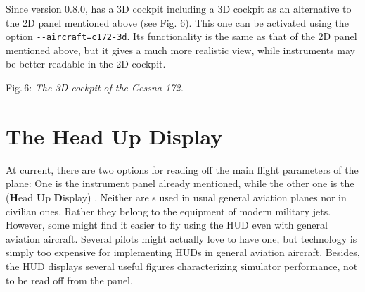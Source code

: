Since version 0.8.0, \FlightGear{} has a 3D cockpit including a 3D cockpit as an alternative to the 2D panel mentioned above (see Fig. 6). This one can be activated using the option \texttt{-$ $-aircraft=c172-3d}. Its functionality is the same as that of the 2D panel mentioned above, but it gives a much more realistic view, while instruments may be better readable in the 2D cockpit.
\medskip

 \centerline{}

\smallskip
 \noindent
Fig.\,6: \textit{The 3D cockpit of the Cessna 172.}
\medskip


\section{The Head Up Display}

At current, there are two options for reading off the main flight parameters of the
plane: One is the instrument panel already mentioned, while the other one is the
 (\textbf{H}ead \textbf{U}p \textbf{D}isplay) . Neither
are s used in usual general aviation planes nor in civilian ones. Rather they
belong to the equipment of modern military jets. However, some might find it easier to
fly using the HUD even with general aviation aircraft. Several  pilots
might actually love to have one, but technology is simply too expensive for implementing
HUDs in general aviation aircraft. Besides, the HUD displays several useful figures
characterizing simulator performance, not to be read off from the panel.


